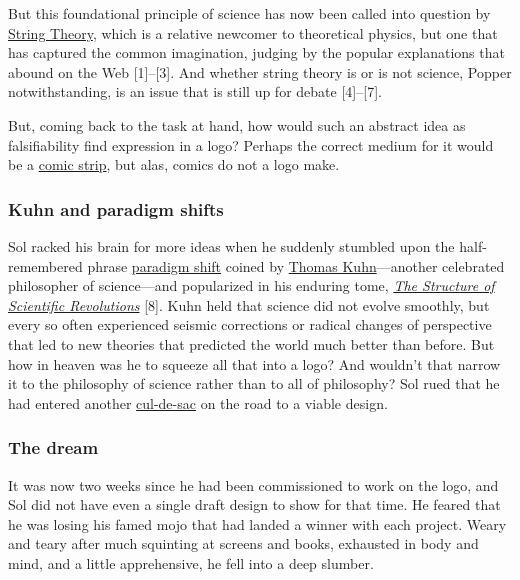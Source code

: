\documentclass[
  11pt,
  british,
  a4paper,
]{article}
\begin{document}
But this foundational principle of science has now been called into
question by
\href{https://www.britannica.com/science/string-theory}{String Theory},
which is a relative newcomer to theoretical physics, but one that has
captured the common imagination, judging by the popular explanations
that abound on the Web {[}1{]}--{[}3{]}. And whether string theory is or
is not science, Popper notwithstanding, is an issue that is still up for
debate {[}4{]}--{[}7{]}.

But, coming back to the task at hand, how would such an abstract idea as
falsifiability find expression in a logo? Perhaps the correct medium for
it would be a
\href{https://www.explainxkcd.com/wiki/index.php/2078:_Popper}{comic
strip}, but alas, comics do not a logo make.

\hypertarget{kuhn-and-paradigm-shifts}{%
\subsubsection{Kuhn and paradigm
shifts}\label{kuhn-and-paradigm-shifts}}

Sol racked his brain for more ideas when he suddenly stumbled upon the
half-remembered phrase
\href{https://www.lexico.com/definition/paradigm_shift}{paradigm shift}
coined by \href{https://en.wikipedia.org/wiki/Thomas_Kuhn}{Thomas
Kuhn}---another celebrated philosopher of science---and popularized in
his enduring tome,
\href{https://www.amazon.com/Structure-Scientific-Revolutions-50th-Anniversary/dp/0226458121/}{\emph{The
Structure of Scientific Revolutions}} {[}8{]}. Kuhn held that science
did not evolve smoothly, but every so often experienced seismic
corrections or radical changes of perspective that led to new theories
that predicted the world much better than before. But how in heaven was
he to squeeze all that into a logo? And wouldn't that narrow it to the
philosophy of science rather than to all of philosophy? Sol rued that he
had entered another
\href{https://www.merriam-webster.com/dictionary/cul-de-sac}{cul-de-sac}
on the road to a viable design.

\hypertarget{the-dream}{%
\subsubsection{The dream}\label{the-dream}}

It was now two weeks since he had been commissioned to work on the logo,
and Sol did not have even a single draft design to show for that time.
He feared that he was losing his famed mojo that had landed a winner
with each project. Weary and teary after much squinting at screens and
books, exhausted in body and mind, and a little apprehensive, he fell
into a deep slumber.
\end{document}

